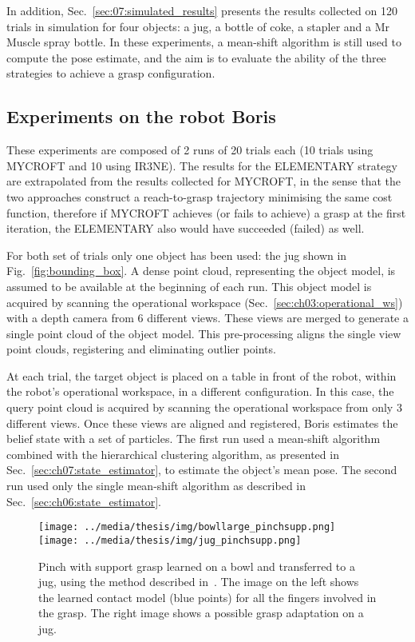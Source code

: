In addition, Sec.~\ref{sec:07:simulated_results} presents the results collected on 120 trials in simulation for four objects: a jug, a bottle of coke, a stapler and a Mr Muscle spray bottle. In these experiments, a mean-shift algorithm is still used to compute the pose estimate, and the aim is to evaluate the ability of the three strategies to achieve a grasp configuration. 

\subsection{Experiments on the robot Boris}\label{sec:07:boris_results}

These experiments are composed of 2 runs of 20 trials each (10 trials using MYCROFT and 10 using IR3NE). The results for the ELEMENTARY strategy are extrapolated from the results collected for MYCROFT, in the sense that the two approaches construct a reach-to-grasp trajectory minimising the same cost function, therefore if MYCROFT achieves (or fails to achieve) a grasp at the first iteration, the ELEMENTARY also would have succeeded (failed) as well. 
 
For both set of trials only one object has been used: the jug shown in Fig.~\ref{fig:bounding_box}. A dense point cloud, representing the object model, is assumed to be available at the beginning of each run. This object model is acquired by scanning the operational workspace (Sec.~\ref{sec:ch03:operational_ws}) with a depth camera from 6 different views. These views are merged to generate a single point cloud of the object model. This pre-processing aligns the single view point clouds, registering and eliminating outlier points.

At each trial, the target object is placed on a table in front of the robot, within the robot's operational workspace, in a different configuration. In this case, the query point cloud is acquired by scanning the operational workspace from only 3 different views. Once these views are aligned and registered, Boris estimates the belief state with a set of particles. The first run used a mean-shift algorithm combined with the hierarchical clustering algorithm, as presented in Sec.~\ref{sec:ch07:state_estimator}, to estimate the object's mean pose. The second run used only the single mean-shift algorithm as described in Sec.~\ref{sec:ch06:state_estimator}.

\begin{figure}[!t]
\centerline{
\texttt{[image: ../media/thesis/img/bowllarge\_pinchsupp.png]}
\qquad
\texttt{[image: ../media/thesis/img/jug\_pinchsupp.png]}
}
\caption[Pinch with support grasp]{Pinch with support grasp learned on a bowl and transferred to a jug, using the method described in~\citep{bib:kopicki_2014}. The image on the left shows the learned contact model (blue points) for all the fingers involved in the grasp. The right image shows a possible grasp adaptation on a jug.}
\label{fig:07:bowllarge_pinchsupp}
\end{figure}

